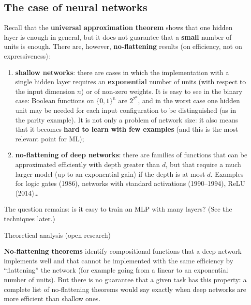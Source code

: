 \subsection{The case of neural
networks}\label{il-caso-delle-reti-neurali}

Recall that the \textbf{universal approximation theorem} shows that one
hidden layer is enough in general, but it does not guarantee that a
\textbf{small} number of units is enough. There are, however,
\textbf{no-flattening} results (on efficiency, not on expressiveness):

\begin{enumerate}
\def\labelenumi{\arabic{enumi}.}
\tightlist
\item
  \textbf{shallow networks}: there are cases in which the
  implementation with a single hidden layer requires an
  \textbf{exponential} number of units (with respect to the input
  dimension \(n\)) or of non-zero weights. It is easy to see in the
  binary case: Boolean functions on \(\{0,1\}^n\) are \(2^{2^n}\), and
  in the worst case one hidden unit may be needed for each input
  configuration to be distinguished (as in the parity example). It is
  not only a problem of network size: it also means that it becomes
  \textbf{hard to learn with few examples} (and this is the most
  relevant point for ML);
\item
  \textbf{no-flattening of deep networks}: there are families of
  functions that can be approximated efficiently with depth greater
  than \(d\), but that require a much larger model (up to an
  exponential gain) if the depth is at most \(d\). Examples for logic
  gates (1986), networks with standard activations (1990--1994), ReLU
  (2014)\ldots{}
\end{enumerate}

The question remains: is it easy to train an MLP with many layers? (See
the techniques later.)

\begin{boxnote}{Theoretical analysis (open research)}

\textbf{No-flattening theorems} identify compositional functions that a
deep network implements well and that cannot be implemented with the
same efficiency by ``flattening'' the network (for example going from a
linear to an exponential number of units). But there is no guarantee
that a given task has this property: a complete list of no-flattening
theorems would say exactly when deep networks are more efficient than
shallow ones.

\end{boxnote}

